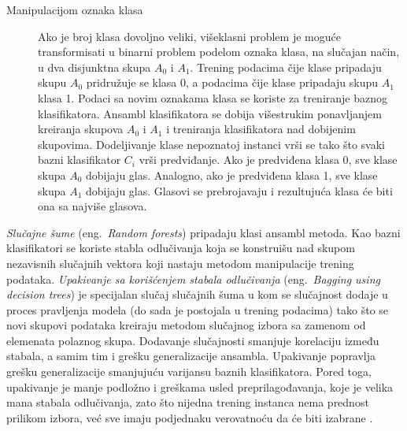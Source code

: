 \documentclass[12pt,oneside]{memoir}
\begin{document}
\begin{description}
\item[Manipulacijom oznaka klasa] Ako je broj klasa dovoljno veliki, višeklasni problem je moguće transformisati u binarni problem podelom oznaka klasa, na slučajan način, u dva disjunktna skupa $A_0$ i $A_1$. Trening podacima čije klase pripadaju skupu $A_0$ pridružuje se klasa 0, a podacima čije klase pripadaju skupu $A_1$ klasa 1. Podaci sa novim oznakama klasa se koriste za treniranje baznog klasifikatora. Ansambl klasifikatora se dobija višestrukim ponavljanjem kreiranja skupova $A_0$ i $A_1$ i treniranja klasifikatora nad dobijenim skupovima. Dodeljivanje klase nepoznatoj instanci vrši se tako što svaki bazni klasifikator $C_i$ vrši predviđanje. Ako je predviđena klasa 0, sve klase skupa $A_0$ dobijaju glas. Analogno, ako je predviđena klasa 1, sve klase skupa $A_1$ dobijaju glas. Glasovi se prebrojavaju i rezultujuća klasa će biti ona sa najviše glasova. \par
\end{description}




\textit{Slučajne šume} (eng.~\textit{Random forests}) pripadaju klasi ansambl metoda. Kao bazni klasifikatori se koriste stabla odlučivanja koja se konstruišu nad skupom nezavisnih slučajnih vektora koji nastaju metodom manipulacije trening podataka. \textit{Upakivanje sa korišćenjem stabala odlučivanja} (eng.~\textit{Bagging using decision trees}) je specijalan slučaj slučajnih šuma u kom se slučajnost dodaje u proces pravljenja modela (do sada je postojala u trening podacima) tako što se novi skupovi podataka kreiraju metodom slučajnog izbora sa zamenom od elemenata polaznog skupa. Dodavanje slučajnosti smanjuje korelaciju između stabala, a samim tim i grešku generalizacije ansambla. %
Upakivanje popravlja grešku generalizacije smanjujuću varijansu baznih klasifikatora. Pored toga, upakivanje je manje podložno i greškama usled preprilagođavanja, koje je velika mana stabala odlučivanja, zato što nijedna trening instanca nema prednost prilikom izbora, već sve imaju podjednaku verovatnoću da će biti izabrane \cite{mitic}.
\end{document}

